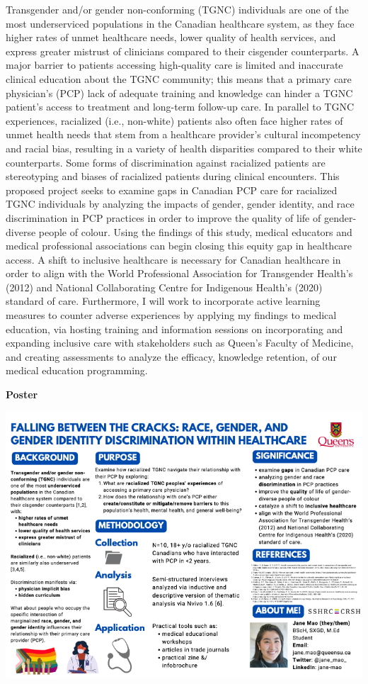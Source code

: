 \documentclass[
]{book}
\begin{document}
Transgender and/or gender non-conforming (TGNC) individuals are one of the most underserviced populations in the Canadian healthcare system, as they face higher rates of unmet healthcare needs, lower quality of health services, and express greater mistrust of clinicians compared to their cisgender counterparts. A major barrier to patients accessing high-quality care is limited and inaccurate clinical education about the TGNC community; this means that a primary care physician's (PCP) lack of adequate training and knowledge can hinder a TGNC patient's access to treatment and long-term follow-up care. In parallel to TGNC experiences, racialized (i.e., non-white) patients also often face higher rates of unmet health needs that stem from a healthcare provider's cultural incompetency and racial bias, resulting in a variety of health disparities compared to their white counterparts. Some forms of discrimination against racialized patients are stereotyping and biases of racialized patients during clinical encounters. This proposed project seeks to examine gaps in Canadian PCP care for racialized TGNC individuals by analyzing the impacts of gender, gender identity, and race discrimination in PCP practices in order to improve the quality of life of gender-diverse people of colour. Using the findings of this study, medical educators and medical professional associations can begin closing this equity gap in healthcare access. A shift to inclusive healthcare is necessary for Canadian healthcare in order to align with the World Professional Association for Transgender Health's (2012) and National Collaborating Centre for Indigenous Health's (2020) standard of care. Furthermore, I will work to incorporate active learning measures to counter adverse experiences by applying my findings to medical education, via hosting training and information sessions on incorporating and expanding inclusive care with stakeholders such as Queen's Faculty of Medicine, and creating assessments to analyze the efficacy, knowledge retention, of our medical education programming.

\textbf{Poster}

\includegraphics{Content/JM.png}
\end{document}
